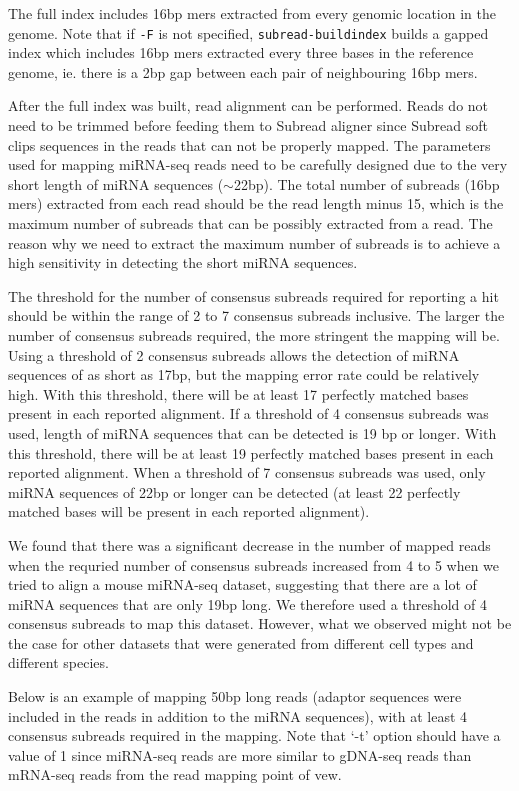 \documentclass[12pt]{report}
\newcommand{\code}[1]{{\small\texttt{#1}}}
\newcommand{\Subread}{\textsf{Subread}}
\begin{document}
The full index includes 16bp mers extracted from every genomic location in the genome.
Note that if \code{-F} is not specified, \code{subread-buildindex} builds a gapped index which includes 16bp mers extracted every three bases in the reference genome, ie. there is a 2bp gap between each pair of neighbouring 16bp mers.

After the full index was built, read alignment can be performed.
Reads do not need to be trimmed before feeding them to {\Subread} aligner since {\Subread} soft clips sequences in the reads that can not be properly mapped.
The parameters used for mapping miRNA-seq reads need to be carefully designed due to the very short length of miRNA sequences ($\sim$22bp).
The total number of subreads (16bp mers) extracted from each read should be the read length minus 15, which
is the maximum number of subreads that can be possibly extracted from a read.
The reason why we need to extract the maximum number of subreads is to achieve a high sensitivity in detecting the short miRNA sequences.

The threshold for the number of consensus subreads required for reporting a hit should be within the range of 2 to 7 consensus subreads inclusive.
The larger the number of consensus subreads required, the more stringent the mapping will be.
Using a threshold of 2 consensus subreads allows the detection of miRNA sequences of as short as 17bp, but the mapping error rate could be relatively high.
With this threshold, there will be at least 17 perfectly matched bases present in each reported alignment.
If a threshold of 4 consensus subreads was used, length of miRNA sequences that can be detected is 19 bp or longer.
With this threshold, there will be at least 19 perfectly matched bases present in each reported alignment.
When a threshold of 7 consensus subreads was used, only miRNA sequences of 22bp or longer can be detected (at least 22 perfectly matched bases will be present in each reported alignment).

We found that there was a significant decrease in the number of mapped reads when the requried number of consensus subreads increased from 4 to 5 when we tried to align a mouse miRNA-seq dataset, suggesting that there are a lot of miRNA sequences that are only 19bp long.
We therefore used a threshold of 4 consensus subreads to map this dataset.
However, what we observed might not be the case for other datasets that were generated from different cell types and different species.

Below is an example of mapping 50bp long reads (adaptor sequences were included in the reads in addition to the miRNA sequences), with at least 4 consensus subreads required in the mapping.
Note that `-t' option should have a value of 1 since miRNA-seq reads are more similar to gDNA-seq reads than mRNA-seq reads from the read mapping point of vew.
\end{document}
